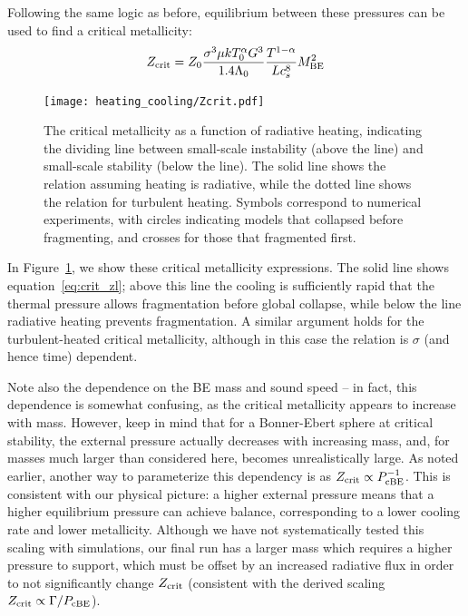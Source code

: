 \documentclass[useAMS,usenatbib]{mn2e}
\begin{document}
Following the same logic as before, equilibrium between these pressures can be used to find a critical metallicity:
\begin{equation}
Z_{\rm crit} = Z_0 \frac{ \sigma^3 \mu k T_0^\alpha G^3}{1.4 \Lambda_0 } \frac{T^{1-\alpha}}{L c_s^8} M_{\rm BE}^2
\label{eq:crit_zt}
\end{equation}


\begin{figure}
\begin{center}
\texttt{[image: heating\_cooling/Zcrit.pdf]}
\end{center}
\caption{\label{fig:zcrit} The critical metallicity as a function of radiative heating, indicating the dividing line between small-scale instability (above the line) and small-scale stability (below the line).  The solid line shows the relation assuming heating is radiative, while the dotted line shows the relation for turbulent heating.  Symbols correspond to numerical experiments, with circles indicating models that collapsed before fragmenting, and crosses for those that fragmented first. }
\end{figure}

In Figure~\ref{fig:zcrit}, we show these critical metallicity expressions.  The solid line shows equation~\ref{eq:crit_zl}; above this line the cooling is sufficiently rapid that the thermal pressure allows fragmentation before global collapse, while below the line radiative heating prevents fragmentation.  A similar argument holds for the turbulent-heated critical metallicity, although in this case the relation is $\sigma$ (and hence time) dependent.

Note also the dependence on the BE mass and sound speed -- in fact, this dependence is somewhat confusing, as the critical metallicity appears to increase with mass.  However, keep in mind that for a Bonner-Ebert sphere at critical stability, the external pressure actually decreases with increasing mass, and, for masses much larger than considered here, becomes unrealistically large.  As noted earlier, another way to parameterize this dependency is as $Z_{\rm crit} \propto P_{\rm cBE}^{-1}$.  This is consistent with our physical picture: a higher external pressure means that a higher equilibrium pressure can achieve balance, corresponding to a lower cooling rate and lower metallicity.  Although we have not systematically tested this scaling with simulations, our final run has a larger mass which requires a higher pressure to support, which must be offset by an increased radiative flux in order to not significantly change $Z_{\rm crit}$ (consistent with the derived scaling $Z_{\rm crit} \propto \Gamma / P_{\rm cBE}$).
\end{document}
